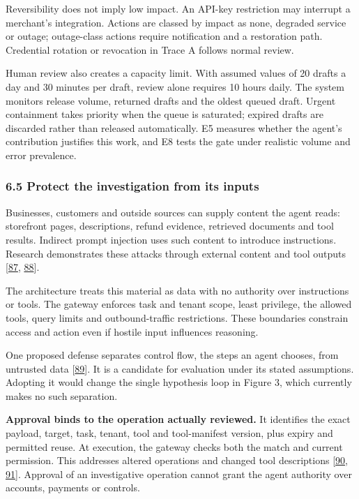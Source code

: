 \documentclass[
  11pt,
]{article}
\begin{document}
Reversibility does not imply low impact. An API-key restriction may
interrupt a merchant's integration. Actions are classed by impact as
none, degraded service or outage; outage-class actions require
notification and a restoration path. Credential rotation or revocation
in Trace A follows normal review.

Human review also creates a capacity limit. With assumed values of 20
drafts a day and 30 minutes per draft, review alone requires 10 hours
daily. The system monitors release volume, returned drafts and the
oldest queued draft. Urgent containment takes priority when the queue is
saturated; expired drafts are discarded rather than released
automatically. E5 measures whether the agent's contribution justifies
this work, and E8 tests the gate under realistic volume and error
prevalence.

\hypertarget{protect-the-investigation-from-its-inputs}{%
\subsubsection{6.5 Protect the investigation from its
inputs}\label{protect-the-investigation-from-its-inputs}}

Businesses, customers and outside sources can supply content the agent
reads: storefront pages, descriptions, refund evidence, retrieved
documents and tool results. Indirect prompt injection uses such content
to introduce instructions. Research demonstrates these attacks through
external content and tool outputs
{[}\protect\hyperlink{ref-Greshake2023}{87},
\protect\hyperlink{ref-Debenedetti2024}{88}{]}.

The architecture treats this material as data with no authority over
instructions or tools. The gateway enforces task and tenant scope, least
privilege, the allowed tools, query limits and outbound-traffic
restrictions. These boundaries constrain access and action even if
hostile input influences reasoning.

One proposed defense separates control flow, the steps an agent chooses,
from untrusted data
{[}\protect\hyperlink{ref-Debenedetti2025CaMeL}{89}{]}. It is a
candidate for evaluation under its stated assumptions. Adopting it would
change the single hypothesis loop in Figure 3, which currently makes no
such separation.

\textbf{Approval binds to the operation actually reviewed.} It
identifies the exact payload, target, task, tenant, tool and
tool-manifest version, plus expiry and permitted reuse. At execution,
the gateway checks both the match and current permission. This addresses
altered operations and changed tool descriptions
{[}\protect\hyperlink{ref-Kumar2026}{90},
\protect\hyperlink{ref-InvariantLabs2025}{91}{]}. Approval of an
investigative operation cannot grant the agent authority over accounts,
payments or controls.
\end{document}
